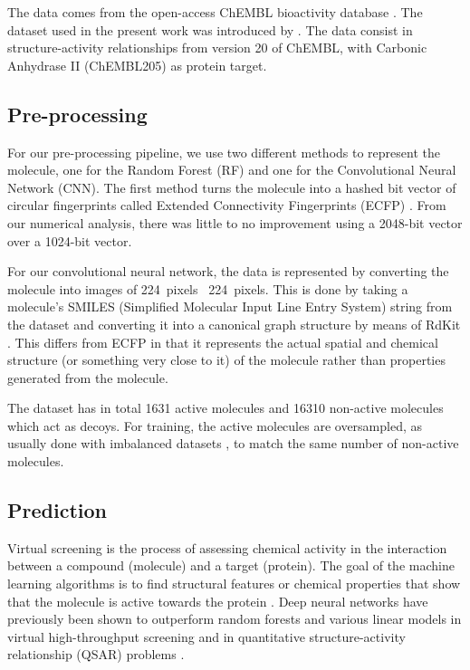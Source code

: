 \documentclass[\ifafour a4paper,12pt,\else a5paper,10pt,\fi%
onecolumn,oneside,article,%
british%
]{memoir}
\theoremstyle{remark}
\theoremstyle{innote}
\renewcommand*{\|}[1][]{\nonscript\:#1\vert\nonscript\:\mathopen{}}
\begin{document}
The data comes from the open-access ChEMBL bioactivity database \autocites{bentoetal2014}. The dataset used in the present work was introduced by \textcite{koutsoukasetal2017}. The data consist in structure-activity relationships from version 20 of ChEMBL, with Carbonic Anhydrase II (ChEMBL205) as protein target.


\subsection{Pre-processing} 

For our pre-processing pipeline, we use two different methods to represent the molecule, one for the Random Forest (RF) and one for the Convolutional Neural Network (CNN). The first method turns the molecule into a hashed bit vector of circular fingerprints called Extended Connectivity Fingerprints (ECFP) \autocites{rogersetal2010}. From our numerical analysis, there was little to no improvement using a 2048-bit vector over a 1024-bit vector. 
  
For our convolutional neural network, the data is represented by converting the molecule into images of 224~pixels \texttimes\ 224~pixels. This is done by taking a molecule's SMILES (Simplified Molecular Input Line Entry System) string \autocites{davidetal2020} from the dataset and converting it into a canonical graph structure by means of RdKit \autocites{rdkit2017}. This differs from ECFP in that it represents the actual spatial and chemical structure (or something very close to it) of the molecule rather than properties generated from the molecule.

The dataset has in total 1631 active molecules and 16310 non-active molecules which act as decoys. For training, the active molecules are oversampled, as usually done with imbalanced datasets \autocites{provost2000}, to match the same number of non-active molecules.

\subsection{Prediction}

Virtual screening is the process of assessing chemical activity in the interaction between a compound (molecule) and a target (protein). The goal of the machine learning algorithms is to find structural features or chemical properties that show that the molecule is active towards the protein \autocites{green2019}. Deep neural networks have previously been shown to outperform random forests and various linear models in virtual high-throughput screening and in quantitative structure-activity relationship (QSAR) problems \autocite{koutsoukasetal2017}.
  
\end{document}
